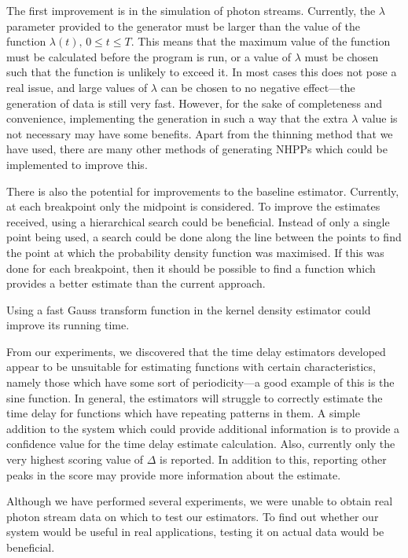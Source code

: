\documentclass[a4paper,11pt]{article}
\begin{document}
   The first improvement is in the simulation of photon streams. Currently, the
   $\lambda$ parameter provided to the generator must be larger than the value
   of the function $\lambda(t),\,0\leq t\leq T$. This means that the maximum
   value of the function must be calculated before the program is run, or a
   value of $\lambda$ must be chosen such that the function is unlikely to
   exceed it. In most cases this does not pose a real issue, and large values of
   $\lambda$ can be chosen to no negative effect---the generation of data is
   still very fast. However, for the sake of completeness and convenience,
   implementing the generation in such a way that the extra $\lambda$ value is
   not necessary may have some benefits. Apart from the thinning method that we
   have used, there are many other methods of generating NHPPs
   \cite{pasupathy2011,lewis1976simulation} which could be implemented to
   improve this.

   There is also the potential for improvements to the baseline
   estimator. Currently, at each breakpoint only the midpoint is considered. To
   improve the estimates received, using a hierarchical search could be
   beneficial. Instead of only a single point being used, a search could be done
   along the line between the points to find the point at which the probability
   density function was maximised. If this was done for each breakpoint, then it
   should be possible to find a function which provides a better estimate than
   the current approach.

   Using a fast Gauss transform function in the kernel density estimator could
   improve its running time.

   From our experiments, we discovered that the time delay estimators developed
   appear to be unsuitable for estimating functions with certain
   characteristics, namely those which have some sort of periodicity---a good
   example of this is the sine function. In general, the estimators will
   struggle to correctly estimate the time delay for functions which have
   repeating patterns in them. A simple addition to the system which could
   provide additional information is to provide a confidence value for the time
   delay estimate calculation. Also, currently only the very highest scoring
   value of $\Delta$ is reported. In addition to this, reporting other peaks in
   the score may provide more information about the estimate.

   Although we have performed several experiments, we were unable to obtain real
   photon stream data on which to test our estimators. To find out whether our
   system would be useful in real applications, testing it on actual data would be
   beneficial.
\end{document}
